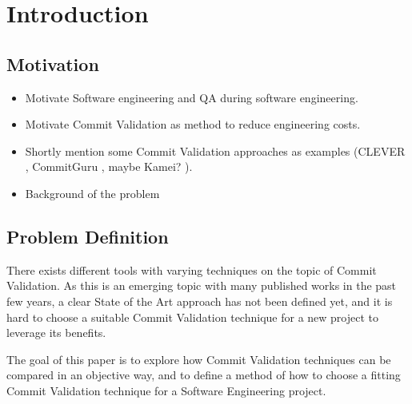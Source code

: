 \section{Introduction}
\label{sec:intro}

\subsection{Motivation}
\begin{itemize}
	\item Motivate Software engineering and QA during software engineering.
	\item Motivate Commit Validation as method to reduce engineering costs.
	\item Shortly mention some Commit Validation approaches as examples (CLEVER \cite{Nayrolles2018}, CommitGuru \cite{Rosen2015}, maybe Kamei? \cite{Kamei2013}).
	\item Background of the problem
\end{itemize}

\subsection{Problem Definition}


There exists different tools with varying techniques on the topic of Commit Validation. As this is an emerging topic with many published works in the past few years, a clear State of the Art approach has not been defined yet, and it is hard to choose a suitable Commit Validation technique for a new project to leverage its benefits. 

The goal of this paper is to explore how Commit Validation techniques can be compared in an objective way, and to define a method of how to choose a fitting Commit Validation technique for a Software Engineering project.

